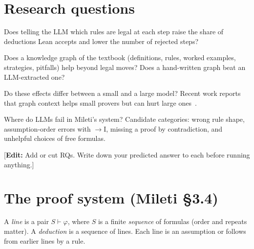 \documentclass[11pt]{article}
\newcommand{\note}[1]{\textcolor{orange!80!black}{\small[\textbf{Edit:} #1]}}
\newcommand{\proves}{\vdash}
\begin{document}
\section{Research questions}
\begin{description}[leftmargin=*,font=\normalfont\bfseries]
  \item[RQ1 (legal moves).] Does telling the LLM which rules are legal at each step raise the share of deductions Lean accepts and lower the number of rejected steps?
  \item[RQ2 (book knowledge).] Does a knowledge graph of the textbook (definitions, rules, worked examples, strategies, pitfalls) help beyond legal moves? Does a hand-written graph beat an LLM-extracted one?
  \item[RQ3 (model size).] Do these effects differ between a small and a large model? Recent work reports that graph context helps small provers but can hurt large ones~\cite{nabi2026structured}.
  \item[RQ4 (failures).] Where do LLMs fail in Mileti's system? Candidate categories: wrong rule shape, assumption-order errors with $\to$I, missing a proof by contradiction, and unhelpful choices of free formulas.
\end{description}
\note{Add or cut RQs. Write down your predicted answer to each before running anything.}

\section{The proof system (Mileti \S3.4)}
A \emph{line} is a pair $S \proves \varphi$, where $S$ is a finite \emph{sequence} of formulas (order and repeats matter). A \emph{deduction} is a sequence of lines. Each line is an assumption or follows from earlier lines by a rule.
\end{document}

